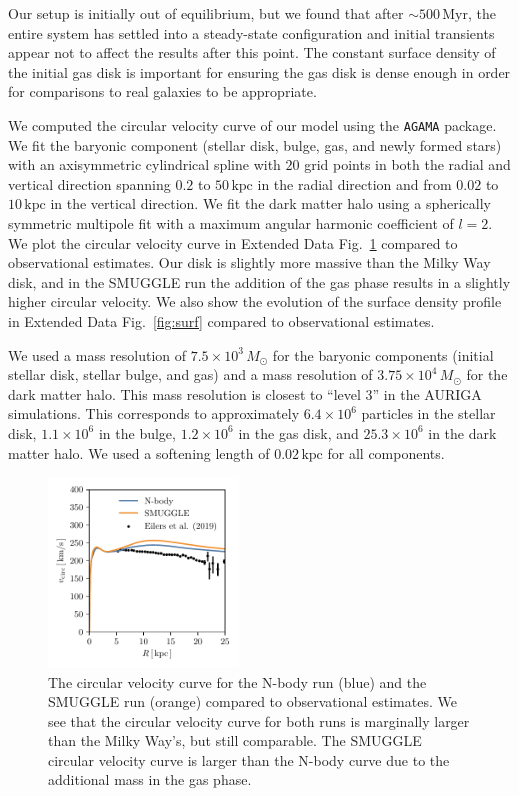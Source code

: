 \documentclass{natureprintstyle}
\begin{document}
Our setup is initially out of equilibrium, but we found that after
$\sim500\,\textrm{Myr}$, the entire system has settled into a steady-state
configuration and initial transients appear not to affect the results after
this point. The constant surface density of the initial gas disk is important
for ensuring the gas disk is dense enough in order for comparisons to real
galaxies to be appropriate.

We computed the circular velocity curve of our model using the \texttt{AGAMA}
package.\cite{2019MNRAS.482.1525V} We fit the baryonic component (stellar
disk, bulge, gas, and newly formed stars) with an axisymmetric cylindrical
spline with $20$ grid points in both the radial and vertical direction
spanning $0.2$ to $50\,\textrm{kpc}$ in the radial direction and from $0.02$
to $10\,\textrm{kpc}$ in the vertical direction. We fit the dark matter halo
using a spherically symmetric multipole fit with a maximum angular harmonic
coefficient of $l=2$. We plot the circular velocity curve in Extended Data
Fig.~\ref{fig:vcirc} compared to observational
estimates.\cite{2019ApJ...871..120E} Our disk is slightly more massive than
the Milky Way disk, and in the SMUGGLE run the addition of the gas phase
results in a slightly higher circular velocity. We also show the evolution of
the surface density profile in Extended Data Fig.~\ref{fig:surf} compared to
observational estimates.\cite{2012ARAA..50..531K}

We used a mass resolution of $7.5\times10^3\,M_{\odot}$ for the baryonic
components (initial stellar disk, stellar bulge, and gas) and a mass
resolution of $3.75\times10^4\,M_{\odot}$ for the dark matter halo. This mass
resolution is closest to ``level 3'' in the AURIGA
simulations.\cite{2017MNRAS.467..179G} This corresponds to approximately
$6.4\times10^6$ particles in the stellar disk, $1.1\times10^6$ in the bulge,
$1.2\times10^6$ in the gas disk, and $25.3\times10^6$ in the dark matter halo.
We used a softening length of $0.02\,\textrm{kpc}$ for all components.

\begin{figure}[h]%
\centering
\includegraphics[width=0.45\textwidth]{fig/fig-vcirc.pdf}
\caption{The circular velocity curve for the N-body run (blue) and the SMUGGLE
run (orange) compared to observational estimates.\cite{2019ApJ...871..120E} We
see that the circular velocity curve for both runs is marginally larger than
the Milky Way's, but still comparable. The SMUGGLE circular velocity curve is
larger than the N-body curve due to the additional mass in the gas phase.}
\label{fig:vcirc}
\end{figure}
\end{document}
